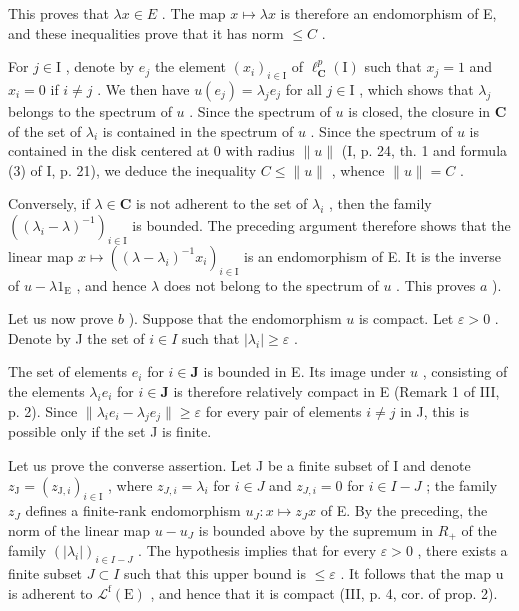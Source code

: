 This proves that \(\lambda x \in E\) . The map \(x \mapsto \lambda x\) is therefore an endomorphism of E, and these inequalities prove that it has norm \(\leqslant C\) .

For \(j \in \mathrm{I}\) , denote by \(e_j\) the element \((x_i)_{i \in \mathrm{I}}\) of \(\ell_{\mathbf{C}}^p(\mathrm{I})\) such that \(x_j = 1\) and \(x_i = 0\) if \(i \neq j\) . We then have \(u(e_j) = \lambda_j e_j\) for all \(j \in \mathrm{I}\) , which shows that \(\lambda_j\) belongs to the spectrum of \(u\) . Since the spectrum of \(u\) is closed, the closure in \(\mathbf{C}\) of the set of \(\lambda_i\) is contained in the spectrum of \(u\) . Since the spectrum of \(u\) is contained in the disk centered at 0 with radius \(\|u\|\) (I, p. 24, th. 1 and formula (3) of I, p. 21), we deduce the inequality \(C \leqslant \|u\|\) , whence \(\|u\| = C\) .

Conversely, if \(\lambda \in \mathbf{C}\) is not adherent to the set of \(\lambda_{i}\) , then the family \(((\lambda_{i} - \lambda)^{-1})_{i\in \mathrm{I}}\) is bounded. The preceding argument therefore shows that the linear map \(x\mapsto ((\lambda -\lambda_i)^{-1}x_i)_{i\in \mathrm{I}}\) is an endomorphism of E. It is the inverse of \(u - \lambda 1_{\mathrm{E}}\) , and hence \(\lambda\) does not belong to the spectrum of \(u\) . This proves \(a\) ).

Let us now prove \(b\) ). Suppose that the endomorphism \(u\) is compact. Let \(\varepsilon > 0\) . Denote by J the set of \(i \in I\) such that \(|\lambda_i| \geqslant \varepsilon\) .

The set of elements \(e_i\) for \(i \in \mathbf{J}\) is bounded in E. Its image under \(u\) , consisting of the elements \(\lambda_i e_i\) for \(i \in \mathbf{J}\) is therefore relatively compact in E (Remark 1 of III, p. 2). Since \(\| \lambda_i e_i - \lambda_j e_j \| \geqslant \varepsilon\) for every pair of elements \(i \neq j\) in J, this is possible only if the set J is finite.

Let us prove the converse assertion. Let J be a finite subset of I and denote \(z_{\mathrm{J}} = (z_{\mathrm{J},i})_{i \in \mathrm{I}}\) , where \(z_{J,i} = \lambda_i\) for \(i \in J\) and \(z_{J,i} = 0\) for \(i \in I - J\) ; the family \(z_J\) defines a finite-rank endomorphism \(u_J \colon x \mapsto z_J x\) of E. By the preceding, the norm of the linear map \(u - u_J\) is bounded above by the supremum in \(R_+\) of the family \((|\lambda_i|)_{i \in I-J}\) . The hypothesis implies that for every \(\varepsilon > 0\) , there exists a finite subset \(J \subset I\) such that this upper bound is \(\leqslant \varepsilon\) . It follows that the map u is adherent to \(\mathcal{L}^{\mathrm{f}}(\mathrm{E})\) , and hence that it is compact (III, p. 4, cor. of prop. 2).


